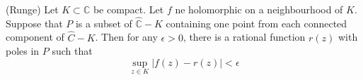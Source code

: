 \documentclass[lang=en, color=blue, ]{elegantbook}
\newcommand{\C}{\mathbb{C}}
\begin{document}
\begin{theorem}
    (Runge) Let $K\subset\C$ be compact. Let $f$ ne holomorphic on a neighbourhood of $K$. Suppose that $P$ is a subset of $\hat{\C}-K$ containing one point from each connected component of $\hat{C}-K$. Then for any $\epsilon >0$, there is a rational function $r(z)$ with poles in $P$ such that
    \[
    \sup_{z\in K}|f(z)-r(z)| < \epsilon
    \]
\end{theorem}
 
\end{document}
